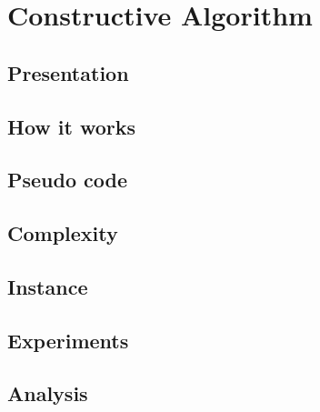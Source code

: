 
\section{Constructive Algorithm}


    \subsection{Presentation}


\subsection{How it works}


\subsection{Pseudo code}


\subsection{Complexity}


\subsection{Instance}


\subsection{Experiments}


\subsection{Analysis}

\newpage